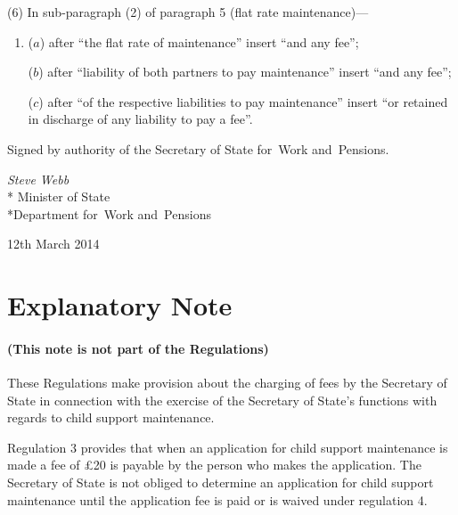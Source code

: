 \documentclass[12pt,a4paper]{article}
\begin{document}
(6) In sub-paragraph (2) of paragraph 5 (flat rate maintenance)—
\begin{enumerate}\item[]
($a$) after “the flat rate of maintenance” insert “and any fee”;

($b$) after “liability of both partners to pay maintenance” insert “and any fee”;

($c$) after “of the respective liabilities to pay maintenance” insert “or retained in discharge of any liability to pay a fee”.
\end{enumerate}

\bigskip

\pagebreak[3]

Signed 
by authority of the 
Secretary of State for~Work and~Pensions.

{\raggedleft
\emph{Steve Webb}\\*
Minister
of State\\*Department 
for~Work and~Pensions

}

12th March 2014

\small

\part{Explanatory Note}

\renewcommand\parthead{— Explanatory Note}

\subsection*{(This note is not part of the Regulations)}

These Regulations make provision about the charging of fees by the Secretary of State in connection with the exercise of the Secretary of State’s functions with regards to child support maintenance.

Regulation 3 provides that when an application for child support maintenance is made a fee of £20 is payable by the person who makes the application. The Secretary of State is not obliged to determine an application for child support maintenance until the application fee is paid or is waived under regulation 4.
\end{document}
